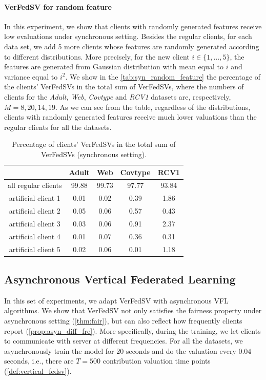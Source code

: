 \paragraph{VerFedSV for random feature}
In this experiment, we show that clients with randomly generated features receive low evaluations under synchronous setting. Besides the regular clients, for each data set, we add 5 more clients whose features are randomly generated according to different distributions. More precisely, for the new client $i \in \{1,\dots,5\}$, the features are generated from Gaussian distribution with mean equal to $i$ and variance equal to $i^2$. We show in the \autoref{tab:syn_random_feature} the percentage of the clients' VerFedSVs in the total sum of VerFedSVs, where the numbers of clients for the \emph{Adult}, \emph{Web}, \emph{Covtype} and \emph{RCV1} datasets are, respectively, $M = 8, 20, 14, 19$. As we can see from the table, regardless of the distributions, clients with randomly generated features receive much lower valuations than the regular clients for all the datasets. 
\begin{table}[t]
    \centering
    \begin{tabular}{ccccc}
    \toprule
                         & Adult & Web   & Covtype  & RCV1 \\ \midrule
     all regular clients & 99.88 & 99.73 & 97.77    & 93.84\\
     artificial client 1 & 0.01  & 0.02  & 0.39     & 1.86 \\
     artificial client 2 & 0.05  & 0.06  & 0.57     & 0.43\\
     artificial client 3 & 0.03  & 0.06  & 0.91     & 2.37\\
     artificial client 4 & 0.01  & 0.07  & 0.36     & 0.31\\
     artificial client 5 & 0.02  & 0.06  & 0.01     & 1.18\\
    \bottomrule
    \end{tabular}
    \caption{Percentage of clients' VerFedSVs in the total sum of VerFedSVs (synchronous setting).}
    \label{tab:syn_random_feature}
\end{table}

\subsection{Asynchronous Vertical Federated Learning} \label{sec:8.8.3}
In this set of experiments, we adapt VerFedSV with asynchronous VFL algorithms. We show that VerFedSV not only satisfies the fairness property under asynchronous setting (\autoref{thm:fair}), but can also reflect how frequently clients report (\autoref{prop:asyn_diff_fre}). More specifically, during the training, we let clients to communicate with server at different frequencies. For all the datasets, we asynchronously train the model for $20$ seconds and do the valuation every $0.04$ seconds, i.e., there are $T = 500$ contribution valuation time points (\autoref{def:vertical_fedsv}). 


